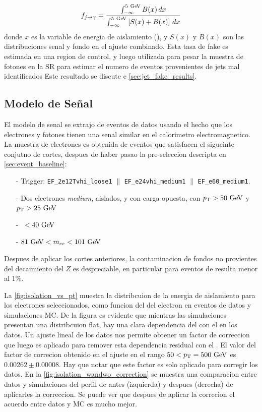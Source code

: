 \begin{equation}\label{eq:jfake_formula}
    f_{j\to \gamma} = \frac{\int_{-\infty}^{5\gev} B(x)\, dx}{\int_{-\infty}^{5\gev} \left[S(x)+B(x)\right]\, dx}
\end{equation}
%
donde $x$ es la variable de energia de aislamiento (\etiso), y $S(x)$ y $B(x)$
son las distribuciones senal y fondo en el ajuste combinado.
Esta tasa de fake es estimada en una region de control, y luego utilizada para pesar la muestra
de fotones en la SR para estimar el numero de eventos provenientes de jets mal identificados Este
resultado se discute e \ref{sec:jet_fake_results}.

\subsection{Modelo de Señal} \label{sec:jfake_sig_template}

El modelo de senal se extrajo de eventos de datos {\Zee} usando el hecho que los
electrones y fotones tienen una senal similar en el calorimetro electromagnetico.
La muestra de electrones es obtenida de eventos que satisfacen el sigueinte conjutno
de cortes, despues de haber pasao la pre-seleccion descripta en \ref{sec:event_baseline}:

\begin{itemize}\itemsep0.1cm
\item[-] Trigger: \texttt{EF\_2e12Tvhi\_loose1} $\parallel$ \texttt{EF\_e24vhi\_medium1} $\parallel$ \texttt{EF\_e60\_medium1}.
\item[-] Dos electrones \emph{medium}, aislados, y con carga opuesta, con $\pt>50 \gev$ y $\pt>25 \gev$
\item[-] \MET\ $<40\gev$
\item[-] $81\gev<m_{ee}<101\gev$
\end{itemize}

Despues de aplicar los cortes anteriores, la contaminacion de fondos no provientes
del decaimiento del $Z$ es despreciable, en particular para eventos de {\ttbar}
resulta menor al $1\%$.

La {\fig} \ref{fig:isolation_vs_pt} muestra la distribcuion de la energia de aislamiento
para los electrones seleccionados, como funcion del {\pt} del electron en eventos de datos y
simulaciones MC.
De la figura es evidente que mientras las simulaciones presentan una distribcuion flat, hay
una clara dependencia del {\etiso} con el {\pt} en los datos.
Un ajuste lineal de los datos nos permite obtener un factor de correccion que luego es
aplicado para remover esta dependencia residual con el \pt. El valor del factor de
correcion obtenido en el ajuste en el rango $50<\pt=500 \gev$ es  $0.00262 \pm 0.00008$.
Hay que notar que este factor es solo aplicado para corregir los datos.
En la  {\fig} \ref{fig:isolation_wandwo_correction} se muestra una comparacion entre
datos y simulaciones del perfil de {\etiso} antes (izquierda) y despues (derecha) de aplicarles
la correccion. Se puede ver que despues de aplicar la correcion el acuerdo entre datos y MC
es mucho mejor.

